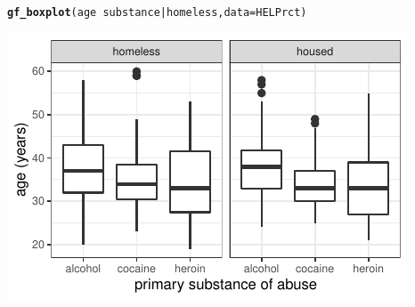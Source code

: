 \documentclass[twoside]{book}\usepackage[]{graphicx}\usepackage[]{xcolor}
\makeatletter
\def\maxwidth{ %
  \ifdim\Gin@nat@width>\linewidth
    \linewidth
  \else
    \Gin@nat@width
  \fi
}
\newcommand{\hlopt}[1]{\textcolor[rgb]{0,0,0}{#1}}%
\newcommand{\hlstd}[1]{\textcolor[rgb]{0.345,0.345,0.345}{#1}}%
\newcommand{\hlkwc}[1]{\textcolor[rgb]{0.333,0.667,0.333}{#1}}%
\newcommand{\hlkwd}[1]{\textcolor[rgb]{0.737,0.353,0.396}{\textbf{#1}}}%
\newenvironment{kframe}{%
 \def\at@end@of@kframe{}%
 \ifinner\ifhmode%
  \def\at@end@of@kframe{\end{minipage}}%
  \begin{minipage}{\columnwidth}%
 \fi\fi%
 \def\FrameCommand##1{\hskip\@totalleftmargin \hskip-\fboxsep
 \colorbox{shadecolor}{##1}\hskip-\fboxsep
     \hskip-\linewidth \hskip-\@totalleftmargin \hskip\columnwidth}%
 \MakeFramed {\advance\hsize-\width
   \@totalleftmargin\z@ \linewidth\hsize
   \@setminipage}}%
 {\par\unskip\endMakeFramed%
 \at@end@of@kframe}
\newenvironment{knitrout}{}{} %
\makeatother
\begin{document}
\begin{knitrout}
\color{fgcolor}\begin{kframe}
\begin{alltt}
\hlkwd{gf_boxplot}\hlstd{(age} \hlopt{~} \hlstd{substance} \hlopt{|} \hlstd{homeless,} \hlkwc{data}\hlstd{=HELPrct)}
\end{alltt}
\end{kframe}

{\centering \includegraphics[width=\maxwidth]{figures/fig-bwplot3-1} 

}



\end{knitrout}
\end{document}
